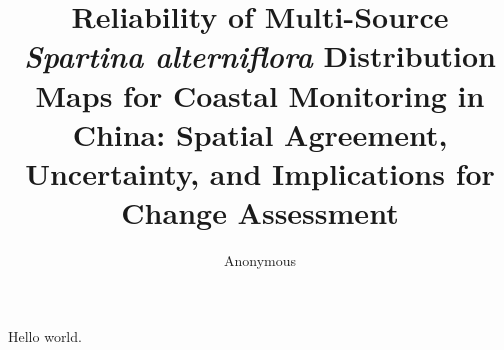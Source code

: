 \documentclass[11pt]{article}
\title{Reliability of Multi-Source \textit{Spartina alterniflora} Distribution Maps
for Coastal Monitoring in China: Spatial Agreement, Uncertainty, and Implications
for Change Assessment}
\author{Anonymous}
\date{}
\begin{document}
\maketitle

Hello world.
\end{document}
